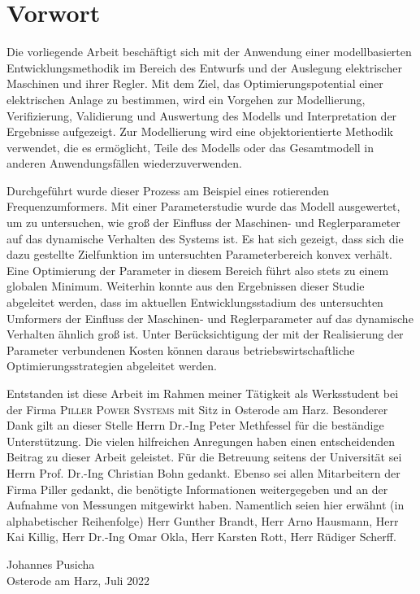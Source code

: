 \chapter{Vorwort}
\label{sec:Vorwort}
Die vorliegende Arbeit beschäftigt sich mit der Anwendung einer modellbasierten Entwicklungsmethodik im Bereich des Entwurfs und der Auslegung elektrischer Maschinen und ihrer Regler. Mit dem Ziel, das Optimierungspotential einer elektrischen Anlage zu bestimmen, wird ein Vorgehen zur Modellierung, Verifizierung, Validierung und Auswertung des Modells und Interpretation der Ergebnisse aufgezeigt. Zur Modellierung wird eine objektorientierte Methodik verwendet, die es ermöglicht, Teile des Modells oder das Gesamtmodell in anderen Anwendungsfällen wiederzuverwenden. 
\smallskip

Durchgeführt wurde dieser Prozess am Beispiel eines rotierenden Frequenzumformers. Mit einer Parameterstudie wurde das Modell ausgewertet, um zu untersuchen, wie groß der Einfluss der Maschinen- und Reglerparameter auf das dynamische Verhalten des Systems ist. Es hat sich gezeigt, dass sich die dazu gestellte Zielfunktion im untersuchten Parameterbereich konvex verhält. Eine Optimierung der Parameter in diesem Bereich führt also stets zu einem globalen Minimum. Weiterhin konnte aus den Ergebnissen dieser Studie abgeleitet werden, dass im aktuellen Entwicklungsstadium des untersuchten Umformers der Einfluss der Maschinen- und Reglerparameter auf das dynamische Verhalten ähnlich groß ist. Unter Berücksichtigung der mit der Realisierung der Parameter verbundenen Kosten können daraus betriebswirtschaftliche Optimierungsstrategien abgeleitet werden.
\medskip

Entstanden ist diese Arbeit im Rahmen meiner Tätigkeit als Werksstudent bei der Firma \textsc{Piller Power Systems} mit Sitz in Osterode am Harz. Besonderer Dank gilt an dieser Stelle Herrn Dr.-Ing Peter Methfessel für die beständige Unterstützung. Die vielen hilfreichen Anregungen haben einen entscheidenden Beitrag zu dieser Arbeit geleistet. Für die Betreuung seitens der Universität sei Herrn Prof. Dr.-Ing Christian Bohn gedankt. Ebenso sei allen Mitarbeitern der Firma Piller gedankt, die benötigte Informationen weitergegeben und an der Aufnahme von Messungen mitgewirkt haben. Namentlich seien hier erwähnt (in alphabetischer Reihenfolge) Herr Gunther Brandt, Herr Arno Hausmann, Herr Kai Killig, Herr Dr.-Ing Omar Okla, Herr Karsten Rott, Herr Rüdiger Scherff.
\bigskip

\noindent
Johannes Pusicha \\
Osterode am Harz, Juli 2022
